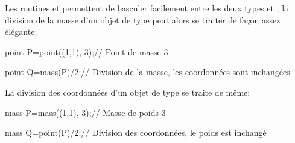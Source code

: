 \documentclass[pdftex]{article}
\begin{document}
Les routines  et
permettent de basculer facilement entre les deux types  et
; la division de la masse d'un objet de type 
peut alors se traiter de façon assez élégante:
\begin{Vcolor}
  point P=point((1,1), 3);// Point de masse 3

  point Q=mass(P)/2;// Division de la masse, les coordonnées sont inchangées

\end{Vcolor}
La division des coordonnées d'un objet de type  se traite de même:
\begin{Vcolor}
  mass P=mass((1,1), 3);// Masse de poids 3

  mass Q=point(P)/2;// Division des coordonnées, le poids est inchangé

\end{Vcolor}
\end{document}
